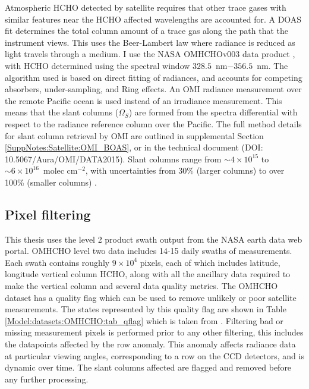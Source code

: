   Atmospheric HCHO detected by satellite requires that other trace gases with similar features near the HCHO affected wavelengths are accounted for.
  A DOAS fit determines the total column amount of a trace gas along the path that the instrument views.
  This uses the Beer-Lambert law where radiance is reduced as light travels through a medium.
  I use the NASA OMHCHOv003 data product \parencite{Abad2015}, with HCHO determined using the spectral window $328.5$~nm$ - 356.5$~nm. 
  The algorithm used is based on direct fitting of radiances, and accounts for competing absorbers, under-sampling, and Ring effects.
  An OMI radiance measurement over the remote Pacific ocean is used instead of an irradiance measurement.
  This means that the slant columns ($\Omega_S$) are formed from the spectra differential with respect to the radiance reference column over the Pacific.
  The full method details for slant column retrieval by OMI are outlined in supplemental Section \ref{SuppNotes:Satellite:OMI_BOAS}, or in the technical document (DOI: 10.5067/Aura/OMI/DATA2015).
  Slant columns range from $\sim 4\times 10^{15} $ to $\sim 6 \times 10^{16}$~molec cm$^{-2}$, with uncertainties from 30\% (larger columns) to over 100\% (smaller columns) \parencite{Abad2015}.
  
  \subsection{Pixel filtering}
  \label{Model:omhcho:pixel_filtering}
  
  This thesis uses the level 2 product swath output from the NASA earth data web portal.
  OMHCHO level two data includes 14-15 daily swaths of measurements.
  Each swath contains roughly $9 \times 10^4$ pixels, each of which includes latitude, longitude vertical column HCHO, along with all the ancillary data required to make the vertical column and several data quality metrics.
  The OMHCHO dataset has a quality flag which can be used to remove unlikely or poor satellite measurements.
  The states represented by this quality flag are shown in Table \ref{Model:datasets:OMHCHO:tab_qflag} which is taken from \textcite{Kurosu2014}.
  Filtering bad or missing measurement pixels is performed prior to any other filtering, this includes the datapoints affected by the row anomaly.
  This anomaly \parencite{rowanomaly_url} affects radiance data at particular viewing angles, corresponding to a row on the CCD detectors, and is dynamic over time.
  The slant columns affected are flagged and removed before any further processing.
  

